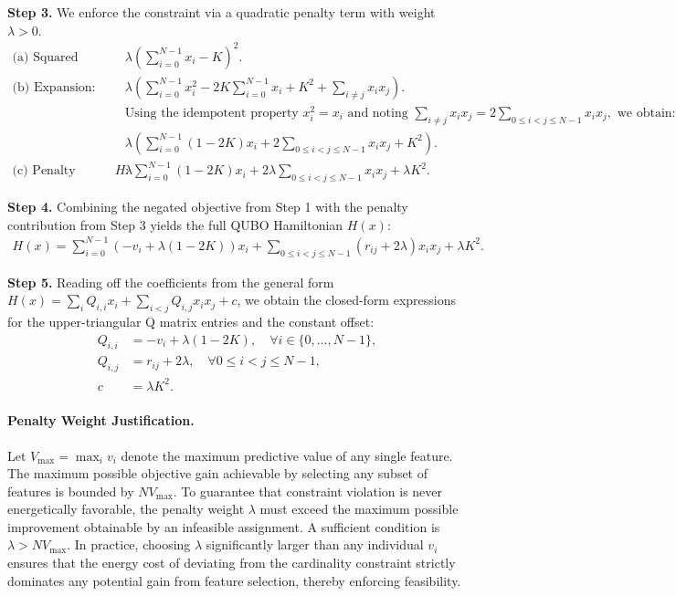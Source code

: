 \documentclass[12pt]{article}
\begin{document}
\textbf{Step 3.} We enforce the constraint via a quadratic penalty term with weight $\lambda > 0$.
\begin{align}
\text{(a) Squared penalty:} \quad & \lambda \left( \sum_{i=0}^{N-1} x_i - K \right)^2. \\
\text{(b) Expansion:} \quad & \lambda \left( \sum_{i=0}^{N-1} x_i^2 - 2K \sum_{i=0}^{N-1} x_i + K^2 + \sum_{i \neq j} x_i x_j \right). \\
& \text{Using the idempotent property } x_i^2 = x_i \text{ and noting } \sum_{i \neq j} x_i x_j = 2 \sum_{0 \leq i < j \leq N-1} x_i x_j, \text{ we obtain:} \\
& \lambda \left( \sum_{i=0}^{N-1} (1 - 2K) x_i + 2 \sum_{0 \leq i < j \leq N-1} x_i x_j + K^2 \right). \\
\text{(c) Penalty contribution to } H: \quad & \lambda \sum_{i=0}^{N-1} (1 - 2K) x_i + 2\lambda \sum_{0 \leq i < j \leq N-1} x_i x_j + \lambda K^2.
\end{align}

\textbf{Step 4.} Combining the negated objective from Step 1 with the penalty contribution from Step 3 yields the full QUBO Hamiltonian $H(x)$:
\begin{align}
H(x) = \sum_{i=0}^{N-1} \left( -v_i + \lambda(1 - 2K) \right) x_i + \sum_{0 \leq i < j \leq N-1} \left( r_{ij} + 2\lambda \right) x_i x_j + \lambda K^2.
\end{align}

\textbf{Step 5.} Reading off the coefficients from the general form $H(x) = \sum_{i} Q_{i,i} x_i + \sum_{i < j} Q_{i,j} x_i x_j + c$, we obtain the closed-form expressions for the upper-triangular Q matrix entries and the constant offset:
\begin{align}
Q_{i,i} &= -v_i + \lambda(1 - 2K), \quad \forall i \in \{0, \dots, N-1\}, \\
Q_{i,j} &= r_{ij} + 2\lambda, \quad \forall 0 \leq i < j \leq N-1, \\
c &= \lambda K^2.
\end{align}

\paragraph{Penalty Weight Justification.}
Let $V_{\max} = \max_{i} v_i$ denote the maximum predictive value of any single feature. The maximum possible objective gain achievable by selecting any subset of features is bounded by $N V_{\max}$. To guarantee that constraint violation is never energetically favorable, the penalty weight $\lambda$ must exceed the maximum possible improvement obtainable by an infeasible assignment. A sufficient condition is $\lambda > N V_{\max}$. In practice, choosing $\lambda$ significantly larger than any individual $v_i$ ensures that the energy cost of deviating from the cardinality constraint strictly dominates any potential gain from feature selection, thereby enforcing feasibility.
\end{document}
